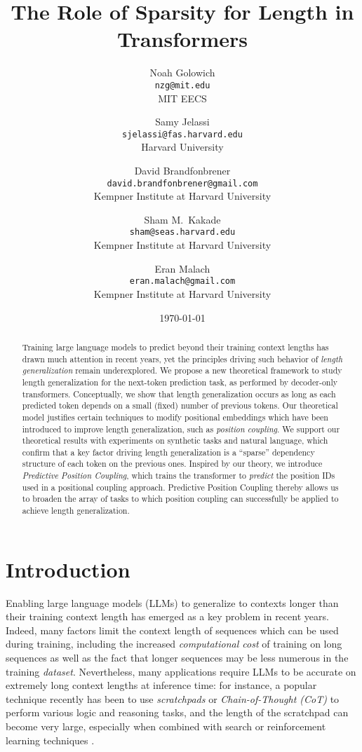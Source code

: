 \documentclass{article}
\title{The Role of Sparsity for Length \Generalization in Transformers}
\date{\today}
\author{Noah Golowich \\ {\small \texttt{nzg@mit.edu}} \\ {\small MIT EECS} \and Samy Jelassi \\ {\small \texttt{sjelassi@fas.harvard.edu}} \\ {\small Harvard University} \and David Brandfonbrener \\ {\small \texttt{david.brandfonbrener@gmail.com}} \\ {\small Kempner Institute at Harvard University} \and Sham M.~Kakade \\ {\small \texttt{sham@seas.harvard.edu}} \\ {\small Kempner Institute at Harvard University} \and Eran Malach \\ {\small \texttt{eran.malach@gmail.com}}  \\ {\small Kempner Institute at Harvard University}}
\newcommand{\arxiv}[1]{\iftoggle{icml}{}{#1}}
\newcommand{\icml}[1]{\iftoggle{icml}{#1}{}}
\begin{document}
\arxiv{\maketitle}
\icml{
  \twocolumn[
  \icmltitle{The Role of Sparsity for Length \Generalization in LLMs}
  \icmlkeywords{Length \Generalization, Transformers}
  ]
  }
\begin{abstract}
  Training large language models to predict beyond their training context lengths has drawn much attention in recent years, yet the principles driving such behavior of \emph{length generalization} remain underexplored. We propose a new theoretical framework to study length generalization for the next-token prediction task, as performed by decoder-only transformers. Conceptually, we show that length generalization occurs as long as each predicted token depends on a small (fixed) number of previous tokens.\arxiv{ We formalize such tasks via a notion we call \emph{$k$-sparse planted correlation} distributions, and show that an idealized model of transformers which generalize attention heads successfully length-generalize on such tasks. As a bonus, }
    Our theoretical model justifies certain techniques to modify positional embeddings which have been introduced to improve length generalization, such as \emph{position coupling}.\arxiv{

  } We support our theoretical results with experiments on synthetic tasks and natural language, which confirm that a key factor driving length generalization is a ``sparse'' dependency structure of each token on the previous ones. Inspired by our theory, we introduce \emph{Predictive Position Coupling}, which trains the transformer to \emph{predict} the position IDs used in a positional coupling approach. Predictive Position Coupling thereby allows us to broaden the array of tasks to which position coupling can successfully be applied to achieve length generalization.
\end{abstract}

\section{Introduction}
\label{sec:introduction}
Enabling large language models (LLMs) to generalize to contexts longer than their training context length has emerged as a key problem in recent years. %
Indeed, many factors limit the context length of sequences which can be used during training, including the increased \emph{computational cost} of training on long sequences \cite{tay_efficient_2022} as well as the fact that longer sequences may be less numerous in the training \emph{dataset}. Nevertheless, many applications require LLMs to be accurate on extremely long context lengths at inference time: for instance, a popular technique recently has been to use \emph{scratchpads} or \emph{Chain-of-Thought (CoT)} to perform various logic and reasoning tasks, and the length of the scratchpad can become very large, especially when combined with search or reinforcement learning techniques \cite{deepseekai_deepseek_2025,kimiteam_kimi_2025}.
\end{document}
